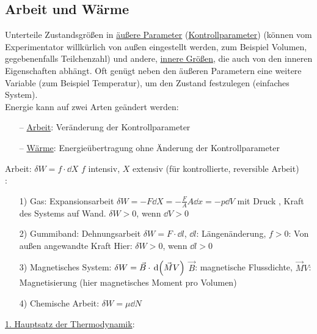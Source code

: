 \subsection{Arbeit und Wärme}
Unterteile Zustandsgrößen in \uline{äußere Parameter} (\uline{Kontrollparameter}) (können vom Experimentator will\-kür\-lich von außen eingestellt werden, zum Beispiel Volumen, gegebenenfalls Teilchenzahl) und andere, \uline{innere Größen}, die auch von den inneren Eigenschaften abhängt. Oft genügt neben den äußeren Parametern eine weitere Variable (zum Beispiel Temperatur), um den Zustand festzulegen (\glqq einfaches System\grqq).\\
Energie kann auf zwei Arten geändert werden:
\begin{itemize}[align=left, labelwidth=, labelsep=1ex, labelindent=0pt, leftmargin=++]
  \item[-- \uline{Arbeit}:] Veränderung der Kontrollparameter
  \item[-- \uline{Wärme}:] Energieübertragung ohne Änderung der Kontrollparameter
\end{itemize}
Arbeit: $\delta W = f\cdot \dd{X}$ $f$ intensiv, $X$ extensiv (für kontrollierte, reversible Arbeit)\\
:
\begin{itemize}[align=left, labelwidth=, labelsep=1ex, labelindent=0pt, leftmargin=++]
  \item[1)]  Gas: Expansionsarbeit  $\delta W = - F \dd{X} = -\frac{F}{A} A \dd{x} = - p \dd{V}$ mit Druck , Kraft  des Systems auf Wand. $\delta W > 0$, wenn $\dd{V} > 0$ 
  \item[2)] Gummiband: Dehnungsarbeit $\delta W = F\cdot\dd{l}$, $\dd{l}$: Längenänderung, $f>0$: Von außen angewandte Kraft Hier: $\delta W >0$, wenn $\dd{l}>0$
  \item[3)] Magnetisches System: $\delta W = \vec{B}\cdot\,\text d{\left( \vec{M}V \right)}$ $\vec{B}$: magnetische Flussdichte, $\vec{M}V$: Magnetisierung (hier magnetisches Moment pro Volumen)
  \item[4)] Chemische Arbeit: $\delta W = \mu \dd{N}$
\end{itemize}
\uline{1. Hauptsatz der Thermodynamik}:\\
\\
